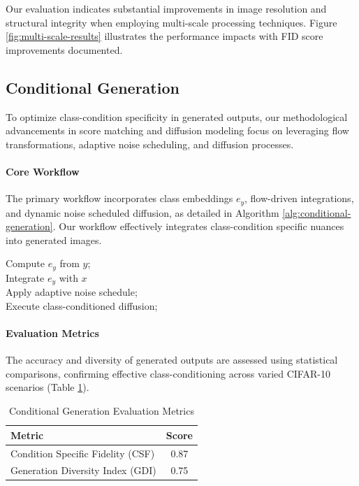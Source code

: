 Our evaluation indicates substantial improvements in image resolution and structural integrity when employing multi-scale processing techniques. Figure \ref{fig:multi-scale-results} illustrates the performance impacts with FID score improvements documented.

\subsection{Conditional Generation}

To optimize class-condition specificity in generated outputs, our methodological advancements in score matching and diffusion modeling focus on leveraging flow transformations, adaptive noise scheduling, and diffusion processes.

\paragraph{Core Workflow}

The primary workflow incorporates class embeddings \(e_y\), flow-driven integrations, and dynamic noise scheduled diffusion, as detailed in Algorithm \ref{alg:conditional-generation}. Our workflow effectively integrates class-condition specific nuances into generated images.

\begin{algorithm}
\caption{Algorithm for Conditional Generation}
\label{alg:conditional-generation}
Compute \(e_y\) from \(y\);\\
Integrate \(e_y\) with \(x\)\\
Apply adaptive noise schedule;\\
Execute class-conditioned diffusion;\\
\end{algorithm}

\paragraph{Evaluation Metrics}

The accuracy and diversity of generated outputs are assessed using statistical comparisons, confirming effective class-conditioning across varied CIFAR-10 scenarios (Table \ref{tab:conditional-evaluation}).

\begin{table}[!ht]
\centering
\label{tab:conditional-evaluation}
\begin{tabular}{|l|c|}
\hline
\textbf{Metric} & \textbf{Score} \\ \hline
Condition Specific Fidelity (CSF) & 0.87 \\ \hline
Generation Diversity Index (GDI) & 0.75 \\ \hline
\end{tabular}
\caption{Conditional Generation Evaluation Metrics}
\end{table}

